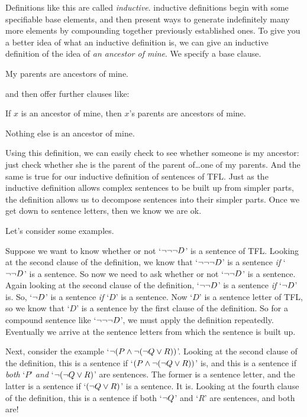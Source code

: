 Definitions like this are called \emph{inductive}. inductive definitions begin with some specifiable base elements, and then present ways to generate indefinitely many more elements by compounding together previously established ones. To give you a better idea of what an inductive definition is, we can give an inductive definition of the idea of \emph{an ancestor of mine}. We specify a base clause.
	\begin{ebullet}
		\item My parents are ancestors of mine.
	\end{ebullet}
and then offer further clauses like:
	\begin{ebullet}
		\item If $x$ is an ancestor of mine, then $x$'s parents are ancestors of mine.
		\item Nothing else is an ancestor of mine.
	\end{ebullet}
Using this definition, we can easily check to see whether someone is my ancestor: just check whether she is the parent of the parent of\ldots one of my parents. And the same is true for our inductive definition of sentences of TFL. Just as the inductive definition allows complex sentences to be built up from simpler parts, the definition allows us to decompose sentences into their simpler parts. Once we get down to sentence letters, then we know we are ok.

Let's consider some examples.

Suppose we want to know whether or not `$\neg \neg \neg D$' is a sentence of TFL. Looking at the second clause of the definition, we know that `$\neg \neg \neg D$' is a sentence \emph{if} `$\neg \neg D$' is a sentence. So now we need to ask whether or not `$\neg \neg D$' is a sentence. Again looking at the second clause of the definition, `$\neg \neg D$' is a sentence \emph{if} `$\neg D$' is. So, `$\neg D$' is a sentence \emph{if} `$D$' is a sentence. Now `$D$' is a sentence letter of TFL, so we know that `$D$' is a sentence by the first clause of the definition. So for a compound sentence like `$\neg \neg \neg D$', we must apply the definition repeatedly. Eventually we arrive at the sentence letters from which the sentence is built up.

Next, consider the example `$\neg (P \wedge \neg (\neg Q \vee R))$'. Looking at the second clause of the definition, this is a sentence if `$(P \wedge \neg (\neg Q \vee R))$' is, and this is a sentence if \emph{both} `$P$' \emph{and} `$\neg (\neg Q \vee R)$' are sentences. The former is a sentence letter, and the latter is a sentence if `$(\neg Q \vee R)$' is a sentence. It is. Looking at the fourth clause of the definition, this is a sentence if both `$\neg Q$' and `$R$' are sentences, and both are!

